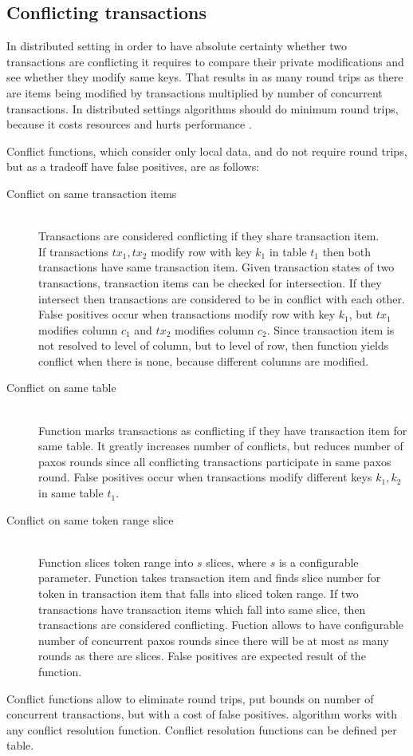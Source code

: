 
\subsection{Conflicting transactions}\label{sec:theory:conflictFunctions}
In distributed setting in order to have absolute certainty whether two transactions are conflicting it requires to compare their private modifications and see whether they modify same keys. That results in as many round trips as there are items being modified by transactions multiplied by number of concurrent transactions. In distributed settings algorithms should do minimum round trips, because it costs resources and hurts performance \cite{rotem2006fallacies}.

Conflict functions, which consider only local data, and do not require round trips, but as a tradeoff have false positives, are as follows:
\begin{description}
\item[Conflict on same transaction items] \hfill \\
	Transactions are considered conflicting if they share transaction item. 
	\\
	If transactions $tx_{1}, tx{_2}$ modify row with key $k_{1}$ in table $t_{1}$ then both transactions have same transaction item. Given transaction states of two transactions, transaction items can be checked for intersection.
	If they intersect then transactions are considered to be in conflict with each other. \\
	False positives occur when transactions modify row with key $k_{1}$, but $tx_{1}$ modifies column $c_{1}$ and $tx_{2}$ modifies column $c_{2}$. Since transaction item is not resolved to level of column, but to level of row, then function yields conflict when there is none, because different columns are modified.	
\item[Conflict on same table] \hfill \\
		Function marks transactions as conflicting if they have transaction item for same table. It greatly increases number of conflicts, but reduces number of paxos rounds since all conflicting transactions participate in same paxos round.
		False positives occur when transactions modify different keys $k_{1}, k_{2}$ in same table $t_{1}$. 
\item[Conflict on same token range slice] \hfill \\
		Function slices token range into $s$ slices, where $s$ is a configurable parameter. Function takes transaction item and finds slice number for token in transaction item that falls into sliced token range. If two transactions have transaction items which fall into same slice, then transactions are considered conflicting.
		Fuction allows to have configurable number of concurrent paxos rounds since there will be at most as many rounds as there are slices. False positives are expected result of the function.
\end{description}

Conflict functions allow to eliminate round trips, put bounds on number of concurrent transactions, but with a cost of false positives. \mpt algorithm works with any conflict resolution function. Conflict resolution functions can be defined per table.